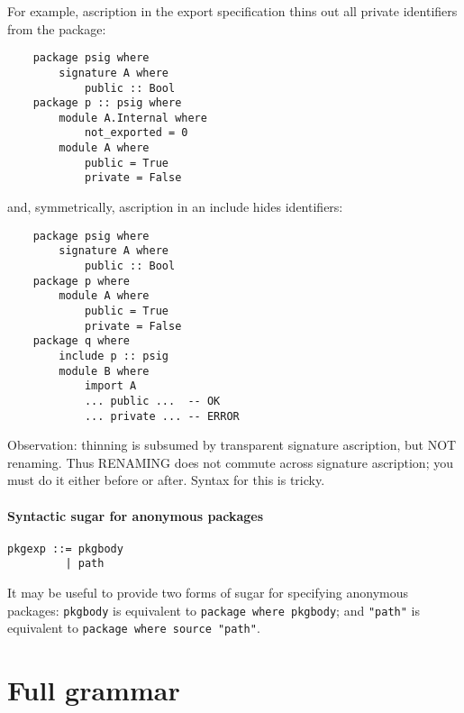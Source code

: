 \documentclass{article}
\newcommand{\Red}[1]{{\color{red} #1}}
\begin{document}
For example, ascription in the export specification thins out all
private identifiers from the package:

\begin{verbatim}
    package psig where
        signature A where
            public :: Bool
    package p :: psig where
        module A.Internal where
            not_exported = 0
        module A where
            public = True
            private = False
\end{verbatim}

and, symmetrically, ascription in an include hides identifiers:

\begin{verbatim}
    package psig where
        signature A where
            public :: Bool
    package p where
        module A where
            public = True
            private = False
    package q where
        include p :: psig
        module B where
            import A
            ... public ...  -- OK
            ... private ... -- ERROR
\end{verbatim}

\Red{Observation: thinning is subsumed by transparent signature ascription, but NOT renaming.  Thus RENAMING does not commute across signature ascription; you must do it either before or after.  Syntax for this is tricky.}

\paragraph{Syntactic sugar for anonymous packages}

\begin{verbatim}
pkgexp ::= pkgbody
         | path
\end{verbatim}

It may be useful to provide two forms of sugar for specifying anonymous packages:
\verb|pkgbody| is equivalent to \verb|package where pkgbody|; and \verb|"path"|
is equivalent to \verb|package where source "path"|.

\appendix
\section{Full grammar}
\end{document}
